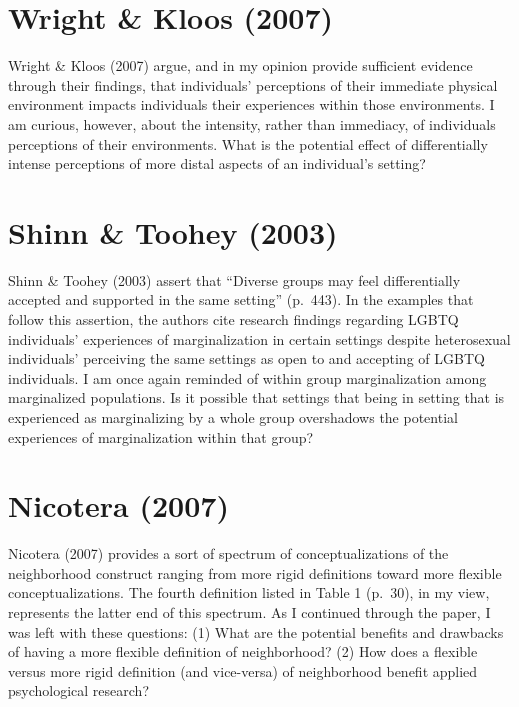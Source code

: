 \documentclass[11pt,]{tufte-handout}
\begin{document}
\section{Wright \& Kloos (2007)}\label{wright2007housing}

Wright \& Kloos (2007) argue, and in my opinion provide sufficient
evidence through their findings, that individuals' perceptions of their
immediate physical environment impacts individuals their experiences
within those environments. I am curious, however, about the intensity,
rather than immediacy, of individuals perceptions of their environments.
What is the potential effect of differentially intense perceptions of
more distal aspects of an individual's setting?

\section{Shinn \& Toohey (2003)}\label{shinn2003community}

Shinn \& Toohey (2003) assert that ``Diverse groups may feel
differentially accepted and supported in the same setting'' (p.~443). In
the examples that follow this assertion, the authors cite research
findings regarding LGBTQ individuals' experiences of marginalization in
certain settings despite heterosexual individuals' perceiving the same
settings as open to and accepting of LGBTQ individuals. I am once again
reminded of within group marginalization among marginalized populations.
Is it possible that settings that being in setting that is experienced
as marginalizing by a whole group overshadows the potential experiences
of marginalization within that group?

\section{Nicotera (2007)}\label{nicotera2007measuring}

Nicotera (2007) provides a sort of spectrum of conceptualizations of the
neighborhood construct ranging from more rigid definitions toward more
flexible conceptualizations. The fourth definition listed in Table 1
(p.~30), in my view, represents the latter end of this spectrum. As I
continued through the paper, I was left with these questions: (1) What
are the potential benefits and drawbacks of having a more flexible
definition of neighborhood? (2) How does a flexible versus more rigid
definition (and vice-versa) of neighborhood benefit applied
psychological research?
\end{document}
